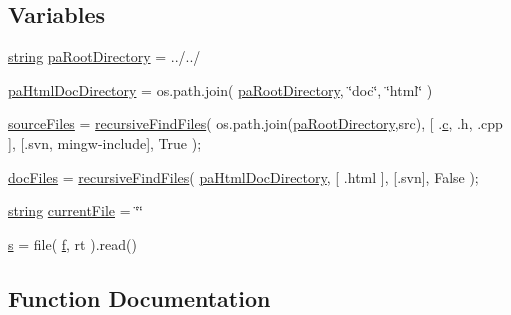 \subsection*{Variables}
\begin{DoxyCompactItemize}
\item 
\hyperlink{test__lib_f_l_a_c_2format_8c_ab02026ad0de9fb6c1b4233deb0a00c75}{string} \hyperlink{namespacecheckfiledocs_a071be53d3f9c9688874f32b6fa0c8cfe}{pa\+Root\+Directory} = \textquotesingle{}../../\textquotesingle{}
\item 
\hyperlink{namespacecheckfiledocs_a82b481f84a09a1fe21d675a6abdcbde7}{pa\+Html\+Doc\+Directory} = os.\+path.\+join( \hyperlink{namespacecheckfiledocs_a071be53d3f9c9688874f32b6fa0c8cfe}{pa\+Root\+Directory}, \char`\"{}doc\char`\"{}, \char`\"{}html\char`\"{} )
\item 
\hyperlink{namespacecheckfiledocs_af96459a5c473c4f00087842c26c9d88a}{source\+Files} = \hyperlink{namespacecheckfiledocs_a110a1d3f50a97505ab88372f8c7d2895}{recursive\+Find\+Files}( os.\+path.\+join(\hyperlink{namespacecheckfiledocs_a071be53d3f9c9688874f32b6fa0c8cfe}{pa\+Root\+Directory},\textquotesingle{}src\textquotesingle{}), \mbox{[} \textquotesingle{}.\hyperlink{rfft2d_test_m_l_8m_ae0323a9039add2978bf5b49550572c7c}{c}\textquotesingle{}, \textquotesingle{}.h\textquotesingle{}, \textquotesingle{}.cpp\textquotesingle{} \mbox{]}, \mbox{[}\textquotesingle{}.svn\textquotesingle{}, \textquotesingle{}mingw-\/include\textquotesingle{}\mbox{]}, True );
\item 
\hyperlink{namespacecheckfiledocs_ae78eef5f29e8adde35c82fdba633bf8e}{doc\+Files} = \hyperlink{namespacecheckfiledocs_a110a1d3f50a97505ab88372f8c7d2895}{recursive\+Find\+Files}( \hyperlink{namespacecheckfiledocs_a82b481f84a09a1fe21d675a6abdcbde7}{pa\+Html\+Doc\+Directory}, \mbox{[} \textquotesingle{}.html\textquotesingle{} \mbox{]}, \mbox{[}\textquotesingle{}.svn\textquotesingle{}\mbox{]}, False );
\item 
\hyperlink{test__lib_f_l_a_c_2format_8c_ab02026ad0de9fb6c1b4233deb0a00c75}{string} \hyperlink{namespacecheckfiledocs_ae88e95260131c4d1b8143308f9b04485}{current\+File} = \char`\"{}\char`\"{}
\item 
\hyperlink{namespacecheckfiledocs_aa41ee49d6195c9664c9f63b0ea875c6d}{s} = file( \hyperlink{checksum_8c_ae747d72a1a803f5ff4a4b2602857d93b}{f}, \textquotesingle{}rt\textquotesingle{} ).read()
\end{DoxyCompactItemize}


\subsection{Function Documentation}
